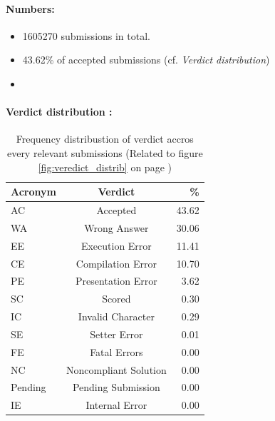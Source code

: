 \paragraph{Numbers:}%
\begin{itemize}
	\setlength\itemsep{0em}
	\item 1605270 submissions in total.
	\item 43.62\% of accepted submissions (cf. \emph{Verdict distribution})
	\item 
\end{itemize}


\paragraph{Verdict distribution :}%
\begin{table}
\caption[Verdicts distribution]{Frequency distribustion of verdict accros every relevant submissions (Related to figure \ref{fig:veredict_distrib} on page \pageref{fig:veredict_distrib})}
\label{tab:veredict_distrib}
\centering
\begin{tabular}{lcr}
\toprule
 Acronym &                Verdict &     \% \\
\midrule
      AC &               Accepted &   43.62 \\
      WA &           Wrong Answer &   30.06 \\
      EE &        Execution Error &   11.41 \\
      CE &      Compilation Error &   10.70 \\
      PE &     Presentation Error &    3.62 \\
      SC &                 Scored &    0.30 \\
      IC &      Invalid Character &    0.29 \\
      SE &           Setter Error &    0.01 \\
      FE &           Fatal Errors &    0.00 \\
      NC &  Noncompliant Solution &    0.00 \\
 Pending &     Pending Submission &    0.00 \\
      IE &         Internal Error &    0.00 \\
\bottomrule
\end{tabular}
\end{table}

